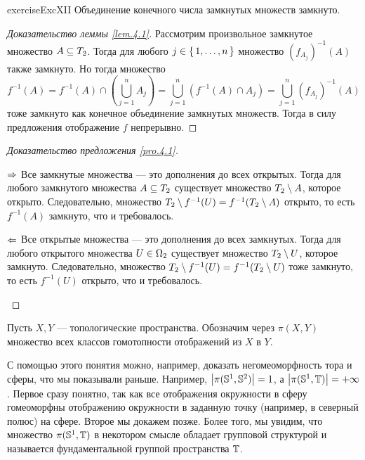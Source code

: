\documentclass[main]{subfiles}
\begin{document}
\begin{restatable}{exercise}{ExcXII}
	Объединение конечного числа замкнутых множеств замкнуто.
\end{restatable}

\begin{proof}[Доказательство леммы \ref{lem.4.1}]
	Рассмотрим произвольное замкнутое множество $ A \subseteq T_2 $. Тогда для любого $ j \in \left\{\,1, \ldots, n\,\right\} $
	множество $ (f_{A_j})^{-1}(A) $ также замкнуто. Но тогда множество
		\[ f^{-1}(A) = f^{-1}(A) \cap \left( \bigcup_{j = 1}^n A_j \right) =
			\bigcup_{j = 1}^n \left( f^{-1}(A) \cap A_j \right) =
			\bigcup_{j = 1}^n (f_{A_j})^{-1}(A) \]
	тоже замкнуто как конечное объединение замкнутых множеств. Тогда в силу предложения отображение $ f $
	непрерывно.
\end{proof}

\begin{proof}[Доказательство предложения \ref{pro.4.1}] \leavevmode
	\begin{multiproof}
		\item[$\Rightarrow$] Все замкнутые множества --- это дополнения до всех открытых. Тогда для любого замкнутого
			множества $ A \subseteq T_2 $ существует множество $ T_2 \setminus A $, которое открыто. Следовательно, множество
			$ T_2 \setminus f^{-1}(U) = f^{-1}(T_2 \setminus A) $ открыто, то есть $ f^{-1}(A) $ замкнуто, что и требовалось.
		\item[$\Leftarrow$] Все открытые множества --- это дополнения до всех замкнутых. Тогда для любого открытого
			множества $ U \in \Omega_2 $ существует множество $ T_2 \setminus U $, которое замкнуто. Следовательно, множество
			$ T_2 \setminus f^{-1}(U) = f^{-1}(T_2 \setminus U) $ тоже замкнуто, то есть $ f^{-1}(U) $ открыто, что и требовалось.
	\end{multiproof}
\end{proof}

\begin{definition}
	Пусть $ X, Y $ --- топологические пространства. Обозначим через $ \pi(X, Y) $ множество всех классов гомотопности
	отображений из $ X $ в $ Y $.
\end{definition}

С помощью этого понятия можно, например, доказать негомеоморфность тора и сферы, что мы показывали раньше. Например,
$ \left\vert\pi(\mathbb{S}^1, \mathbb{S}^2)\right\vert = 1$, а $ \left\vert\pi(\mathbb{S}^1, \mathbb{T})\right\vert = +\infty$. Первое сразу понятно, так как все
отображения окружности в сферу гомеоморфны отображению окружности в заданную точку (например, в северный полюс) на
сфере. Второе мы докажем позже. Более того, мы увидим, что множество $\pi(\mathbb{S}^1, \mathbb{T})$ в некотором смысле
обладает групповой структурой и называется фундаментальной группой пространства $ \mathbb{T} $.
\end{document}
